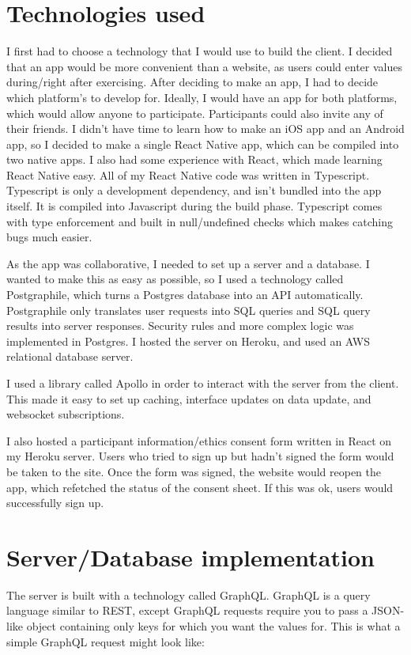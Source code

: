 \documentclass{l4proj}
\begin{document}
\section{Technologies used}
I first had to choose a technology that I would use to build the client. I decided that an app would be more convenient than a website, as users could enter values during/right after exercising. After deciding to make an app, I had to decide which platform's to develop for. Ideally, I would have an app for both platforms, which would allow anyone to participate. Participants could also invite any of their friends. I didn't have time to learn how to make an iOS app and an Android app, so I decided to make a single React Native app, which can be compiled into two native apps. I also had some experience with React, which made learning React Native easy. All of my React Native code was written in Typescript. Typescript is only a development dependency, and isn't bundled into the app itself. It is compiled into Javascript during the build phase. Typescript comes with type enforcement and built in null/undefined checks which makes catching bugs much easier. 

As the app was collaborative, I needed to set up a server and a database. I wanted to make this as easy as possible, so I used a technology called Postgraphile, which turns a Postgres database into an API automatically. Postgraphile only translates user requests into SQL queries and SQL query results into server responses. Security rules and more complex logic was implemented in Postgres. I hosted the server on Heroku, and used an AWS relational database server. 

I used a library called Apollo in order to interact with the server from the client. This made it easy to set up caching, interface updates on data update, and websocket subscriptions. 

I also hosted a participant information/ethics consent form written in React on my Heroku server. Users who tried to sign up but hadn't signed the form would be taken to the site. Once the form was signed, the website would reopen the app, which refetched the status of the consent sheet. If this was ok, users would successfully sign up.

\section{Server/Database implementation}

The server is built with a technology called GraphQL. GraphQL is a query language similar to REST, except GraphQL requests require you to pass a JSON-like object containing only keys for which you want the values for. This is what a simple GraphQL request might look like: 
\end{document}
